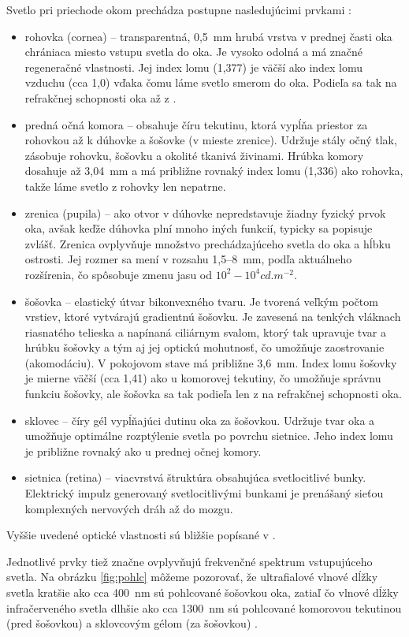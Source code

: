 Svetlo pri priechode okom prechádza postupne nasledujúcimi prvkami \cite{zloz_oka}:
\begin{itemize}
\item rohovka (cornea) -- transparentná, 0,5~mm hrubá vrstva v prednej časti oka chrániaca miesto vstupu svetla do oka. Je vysoko odolná a má značné regeneračné vlastnosti. Jej index lomu (1,377) je väčší ako index lomu vzduchu (cca 1,0) vďaka čomu láme svetlo smerom do oka. Podieľa sa tak na refrakčnej schopnosti oka až z .
\item predná očná komora -- obsahuje číru tekutinu, ktorá vypĺňa priestor za rohovkou až k dúhovke a šošovke (v mieste zrenice). Udržuje stály očný tlak, zásobuje rohovku, šošovku a okolité tkanivá živinami. Hrúbka komory dosahuje až 3,04~mm a má približne rovnaký index lomu (1,336) ako rohovka, takže láme svetlo z rohovky len nepatrne.
\item zrenica (pupila) -- ako otvor v dúhovke nepredstavuje žiadny fyzický prvok oka, avšak keďže dúhovka plní mnoho iných funkcií, typicky sa popisuje zvlášť. Zrenica ovplyvňuje množstvo prechádzajúceho svetla do oka a hĺbku ostrosti. Jej rozmer sa mení v rozsahu 1,5--8~mm, podľa aktuálneho rozšírenia, čo spôsobuje zmenu jasu od $10^2 - 10^4 cd.m^{-2}$. 
\item šošovka -- elastický útvar bikonvexného tvaru. Je tvorená veľkým počtom vrstiev, ktoré vytvárajú gradientnú šošovku. Je zavesená na tenkých vláknach riasnatého telieska a napínaná ciliárnym svalom, ktorý tak upravuje tvar a hrúbku šošovky a tým aj jej optickú mohutnosť, čo umožňuje zaostrovanie (akomodáciu). V pokojovom stave má približne 3,6~mm. Index lomu šošovky je mierne väčší (cca 1,41) ako u komorovej tekutiny, čo umožňuje správnu funkciu šošovky, ale šošovka sa tak podieľa len z  na refrakčnej schopnosti oka.
\item sklovec -- číry gél vypĺňajúci dutinu oka za šošovkou. Udržuje tvar oka a umožňuje optimálne rozptýlenie svetla po povrchu sietnice. Jeho index lomu je približne rovnaký ako u prednej očnej komory.
\item sietnica (retina) -- viacvrstvá štruktúra obsahujúca svetlocitlivé bunky. Elektrický impulz generovaný svetlocitlivými bunkami je prenášaný sieťou komplexných nervových dráh až do mozgu.
\end{itemize}

Vyššie uvedené optické vlastnosti sú bližšie popísané v \cite{vlast_oka}.

Jednotlivé prvky tiež značne ovplyvňujú frekvenčné spektrum vstupujúceho svetla. Na obrázku \ref{fig:pohlc} môžeme pozorovať, že ultrafialové vlnové dĺžky svetla kratšie ako cca 400~nm sú pohlcované šošovkou oka, zatiaľ čo vlnové dĺžky infračerveného svetla dlhšie ako cca 1300~nm sú pohlcované komorovou tekutinou (pred šošovkou) a sklovcovým gélom (za šošovkou) \cite{vlast_oka}.


